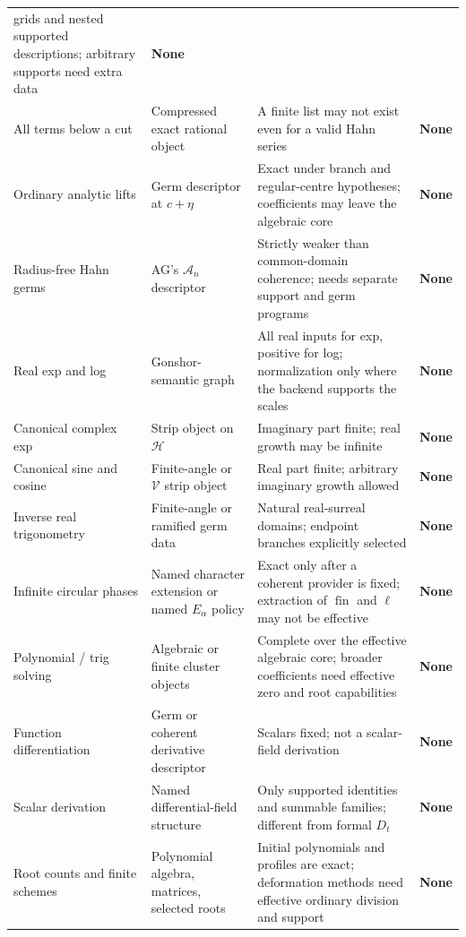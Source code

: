 \documentclass[11pt,letterpaper]{article}
\numberwithin{equation}{section}
\theoremstyle{definition}
\theoremstyle{remark}
\newcommand{\HH}{\mathscr H}
\newcommand{\Acal}{\mathscr A}
\newcommand{\fin}{\operatorname{fin}}
\begin{document}
\begin{longtable}{@{}P{0.175\textwidth}P{0.235\textwidth}P{0.295\textwidth}P{0.205\textwidth}@{}}
grids and nested supported descriptions; arbitrary supports need extra data &
\textbf{None}\\[0.35em]
All terms below a cut & Compressed exact rational object & A finite list may not
exist even for a valid Hahn series & \textbf{None}\\[0.35em]
Ordinary analytic lifts & Germ descriptor at $c+\eta$ & Exact under branch and
regular-centre hypotheses; coefficients may leave the algebraic core &
\textbf{None}\\[0.35em]
Radius-free Hahn germs & AG's $\Acal_n$ descriptor & Strictly weaker than
common-domain coherence; needs separate support and germ programs &
\textbf{None}\\[0.35em]
Real exp and log & Gonshor-semantic graph & All real inputs for exp, positive
for log; normalization only where the backend supports the scales &
\textbf{None}\\[0.35em]
Canonical complex exp & Strip object on $\HH$ & Imaginary part finite; real
growth may be infinite & \textbf{None}\\[0.35em]
Canonical sine and cosine & Finite-angle or $\mathscr V$ strip object & Real
part finite; arbitrary imaginary growth allowed & \textbf{None}\\[0.35em]
Inverse real trigonometry & Finite-angle or ramified germ data & Natural
real-surreal domains; endpoint branches explicitly selected &
\textbf{None}\\[0.35em]
Infinite circular phases & Named character extension or named $E_\alpha$ policy
& Exact only after a coherent provider is fixed; extraction of $\fin$ and $\ell$
may not be effective & \textbf{None}\\[0.35em]
Polynomial / trig solving & Algebraic or finite cluster objects & Complete over
the effective algebraic core; broader coefficients need effective zero and root
capabilities & \textbf{None}\\[0.35em]
Function differentiation & Germ or coherent derivative descriptor & Scalars
fixed; not a scalar-field derivation & \textbf{None}\\[0.35em]
Scalar derivation & Named differential-field structure & Only supported
identities and summable families; different from formal $D_t$ &
\textbf{None}\\[0.35em]
Root counts and finite schemes & Polynomial algebra, matrices, selected roots &
Initial polynomials and profiles are exact; deformation methods need effective
ordinary division and support & \textbf{None}\\[0.35em]

\end{longtable}
\end{document}
